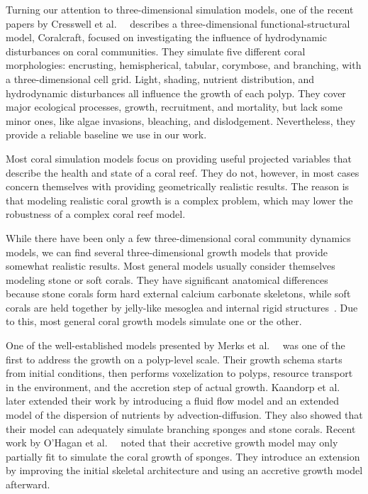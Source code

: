 \documentclass[9pt]{pnas-new}
\renewcommand{\etal}{et al.\ }
\begin{document}
Turning our attention to three-dimensional simulation models, one of the recent papers by Cresswell \etal~\cite{coral_community_3D} describes a three-dimensional functional-structural model, Coralcraft, focused on investigating the influence of hydrodynamic disturbances on coral communities. They simulate five different coral morphologies: encrusting, hemispherical, tabular, corymbose, and branching, with a three-dimensional cell grid. Light, shading, nutrient distribution, and hydrodynamic disturbances all influence the growth of each polyp. They cover major ecological processes, growth, recruitment, and mortality, but lack some minor ones, like algae invasions, bleaching, and dislodgement. Nevertheless, they provide a reliable baseline we use in our work.

Most coral simulation models focus on providing useful projected variables that describe the health and state of a coral reef. They do not, however, in most cases concern themselves with providing geometrically realistic results. The reason is that modeling realistic coral growth is a complex problem, which may lower the robustness of a complex coral reef model.

While there have been only a few three-dimensional coral community dynamics models, we can find several three-dimensional growth models that provide somewhat realistic results. Most general models usually consider themselves modeling stone or soft corals. They have significant anatomical differences because stone corals form hard external calcium carbonate skeletons, while soft corals are held together by jelly-like mesoglea and internal rigid structures~\cite{corals_book_1983}. Due to this, most general coral growth models simulate one or the other. 

One of the well-established models presented by Merks \etal~\cite{polyp_growth} was one of the first to address the growth on a polyp-level scale. Their growth schema starts from initial conditions, then performs voxelization to polyps, resource transport in the environment, and the accretion step of actual growth. Kaandorp \etal~\cite{Kaandorp_2013} later extended their work by introducing a fluid flow model and an extended model of the dispersion of nutrients by advection-diffusion. They also showed that their model can adequately simulate branching sponges and stone corals. Recent work by O'Hagan \etal~\cite{sponge_growth} noted that their accretive growth model may only partially fit to simulate the coral growth of sponges. They introduce an extension by improving the initial skeletal architecture and using an accretive growth model afterward.
\end{document}

